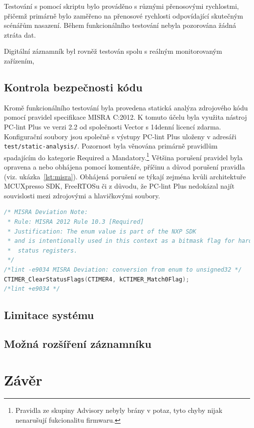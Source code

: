 Testování s pomocí skriptu bylo prováděno s různými přenosovými rychlostmi, přičemž primárně bylo zaměřeno na přenosové rychlosti odpovídající skutečným scénářům nasazení. Během funkcionálního testování nebyla pozorována žádná ztráta dat.

Digitální záznamník byl rovněž testován spolu s reálným monitorovaným zařízením, 

\section{Kontrola bezpečnosti kódu}
Kromě funkcionálního testování byla provedena statická analýza zdrojového kódu pomocí pravidel specifikace MISRA C:2012. K tomuto účelu byla využita nástroj PC-lint Plus ve verzi 2.2 od společnosti Vector s 14denní licencí zdarma. Konfigurační soubory jsou společně s výstupy PC-lint Plus uloženy v adresáři \texttt{test/static-analysis/}. Pozornost byla věnována primárně pravidlům spadajícím do kategorie Required a Mandatory.\footnote{Pravidla ze skupiny Advisory nebyly brány v potaz, tyto chyby nijak nenarušují fukcionalitu firmwaru.} Většina porušení pravidel byla opravena a nebo obhájena pomocí komentáře, příčinu a důvod porušení pravidla (viz. ukázka~\ref{lst:misra}). Obhájená porušení se týkají zejména kvůli architektuře MCUXpresso SDK, FreeRTOSu či z důvodu, že PC-lint Plus nedokázal najít souvislosti mezi zdrojovými a hlavičkovými soubory.

\begin{lstlisting}[language=C, caption={Ukázka odůvodněného porušení pravidla MISRA}, label={lst:misra}]
/* MISRA Deviation Note:
 * Rule: MISRA 2012 Rule 10.3 [Required]
 * Justification: The enum value is part of the NXP SDK
 * and is intentionally used in this context as a bitmask flag for hardware 
 *  status registers.
 */
/*lint -e9034 MISRA Deviation: conversion from enum to unsigned32 */
CTIMER_ClearStatusFlags(CTIMER4, kCTIMER_Match0Flag);
/*lint +e9034 */
\end{lstlisting}


\section{Limitace systému}
\label{limitace}
    

\section{Možná rozšíření záznamníku}
\label{mozne_rozsireni}

\chapter{Závěr}
\label{zaver}



%
